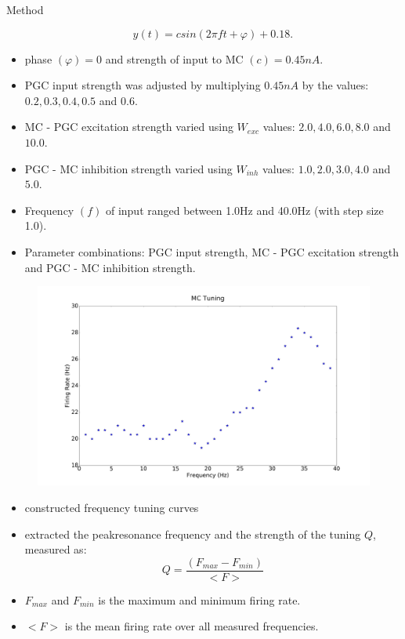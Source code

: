\documentclass[final,hyperref={pdfpagelabels=false}]{beamer}
\begin{document}
\begin{frame}{}
\begin{columns}[t]
\begin{column}{.48\linewidth}
\begin{block}{Method}
\begin{itemize}
\begin{equation}
y(t) = csin(2 \pi ft + \varphi) + 0.18. 
\end{equation}
\item phase $(\varphi) = 0$ and strength of input to MC $(c) = 0.45nA$.
\item PGC input strength was adjusted by multiplying $0.45nA$ by the values: $0.2, 0.3, 0.4, 0.5$ and $0.6$.
\item MC - PGC excitation strength varied using $W_{exc}$ values: $2.0, 4.0, 6.0, 8.0$ and $10.0$.
\item PGC - MC inhibition strength varied using $W_{inh}$ values: $1.0, 2.0, 3.0, 4.0$ and $5.0$.
\item Frequency $(f)$ of input ranged between 1.0Hz and 40.0Hz (with step size 1.0).
\item Parameter combinations: PGC input strength, MC - PGC excitation strength and PGC - MC inhibition strength.
\end{itemize}
\begin{figure}
\center
\includegraphics[scale=0.3]{images/Figure2C}
\end{figure}
\begin{itemize}
\item constructed frequency tuning curves
\item extracted the peakresonance frequency and the strength of the tuning $Q$, measured as:
\begin{equation}
Q = \frac{(F_{max} - F_{min})}{<F>}
\end{equation}
\item $F_{max}$ and $F_{min}$ is the maximum and minimum firing rate.
\item $<F>$ is the mean firing rate over all measured frequencies.
\end{itemize}
\end{block}


\end{column}
\end{columns}
\end{frame}
\end{document}
